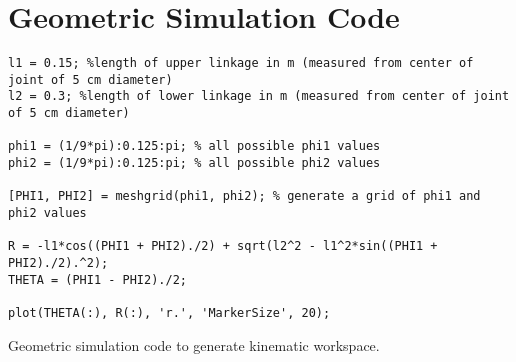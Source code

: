 \chapter{Geometric Simulation Code}

\begin{listing}[ht]
\begin{verbatim}
l1 = 0.15; %length of upper linkage in m (measured from center of joint of 5 cm diameter)
l2 = 0.3; %length of lower linkage in m (measured from center of joint of 5 cm diameter)

phi1 = (1/9*pi):0.125:pi; % all possible phi1 values
phi2 = (1/9*pi):0.125:pi; % all possible phi2 values

[PHI1, PHI2] = meshgrid(phi1, phi2); % generate a grid of phi1 and phi2 values

R = -l1*cos((PHI1 + PHI2)./2) + sqrt(l2^2 - l1^2*sin((PHI1 + PHI2)./2).^2);
THETA = (PHI1 - PHI2)./2;

plot(THETA(:), R(:), 'r.', 'MarkerSize', 20);
\end{verbatim}
\caption{Geometric simulation code to generate kinematic workspace.}
\label{listing:Geometric simulation code}
\end{listing}